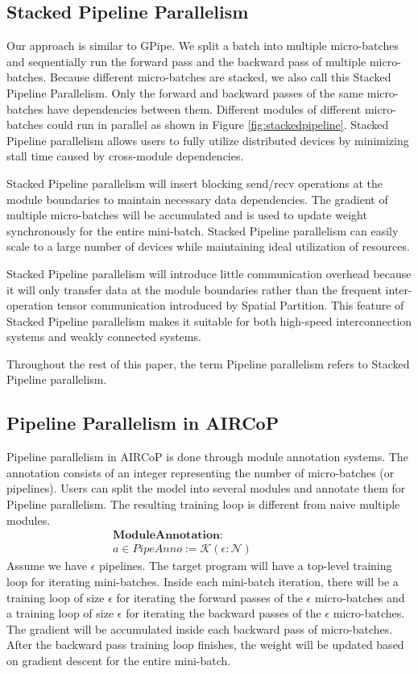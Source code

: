 \documentclass[sigplan, nonacm]{acmart}\settopmatter{printfolios=true,printccs=false,printacmref=false}
\begin{document}
\subsection{Stacked Pipeline Parallelism}
 Our approach is similar to GPipe\cite{huang2019gpipe}. We split a batch into multiple micro-batches and sequentially run the forward pass and the backward pass of multiple micro-batches. Because different micro-batches are stacked, we also call this Stacked Pipeline Parallelism. Only the forward and backward passes of the same micro-batches have dependencies between them. Different modules of different micro-batches could run in parallel as shown in Figure \ref{fig:stackedpipeline}. Stacked Pipeline parallelism allows users to fully utilize distributed devices by minimizing stall time caused by cross-module dependencies. \par
 Stacked Pipeline parallelism will insert blocking send/recv operations at the module boundaries to maintain necessary data dependencies. The gradient of multiple micro-batches will be accumulated and is used to update weight synchronously for the entire mini-batch. Stacked Pipeline parallelism can easily scale to a large number of devices while maintaining ideal utilization of resources.\par
 Stacked Pipeline parallelism will introduce little communication overhead because it will only transfer data at the module boundaries rather than the frequent inter-operation tensor communication introduced by Spatial Partition. This feature of Stacked Pipeline parallelism makes it suitable for both high-speed interconnection systems and weakly connected systems. \par
 Throughout the rest of this paper, the term Pipeline parallelism refers to Stacked Pipeline parallelism.
 \subsection{Pipeline Parallelism in AIRCoP}
 Pipeline parallelism in AIRCoP is done through module annotation systems. The annotation consists of an integer representing the number of micro-batches (or pipelines).
 Users can split the model into several modules and annotate them for Pipeline parallelism. The resulting training loop is different from naive multiple modules.
 \begin{align*}
  \textbf{ModuleAnnotation}: \qquad \qquad& \\
  a \in PipeAnno  := \mathcal{K} (\epsilon : \mathcal{N})\qquad \qquad&
\end{align*}
Assume we have $\epsilon$ pipelines. The target program will have a top-level training loop for iterating mini-batches. Inside each mini-batch iteration, there will be a training loop of size $\epsilon$ for iterating the forward passes of the $\epsilon$ micro-batches and a training loop of size $\epsilon$ for iterating the backward passes of the $\epsilon$ micro-batches. The gradient will be accumulated inside each backward pass of micro-batches. After the backward pass training loop finishes, the weight will be updated based on gradient descent for the entire mini-batch.
\end{document}
